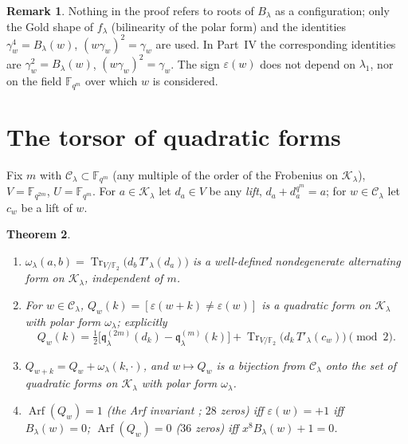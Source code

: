 \documentclass[12pt,a4paper]{amsart}
\newtheorem{theorem}{Theorem}[section]
\theoremstyle{definition}
\newtheorem{remark}[theorem]{Remark}
\newcommand{\F}{\mathbb{F}}
\newcommand{\Tr}{\operatorname{Tr}}
\newcommand{\Arf}{\operatorname{Arf}}
\newcommand{\eps}{\varepsilon}
\newcommand{\Kk}{\mathcal{K}}
\newcommand{\Cc}{\mathcal{C}}
\newcommand{\qq}{\mathfrak{q}}
\begin{document}
\begin{remark}
Nothing in the proof refers to roots of $B_\lambda$ as a configuration; only the Gold shape of $f_\lambda$ (bilinearity of the polar form) and the identities $\gamma_w^4=B_\lambda(w)$, $(w\gamma_w)^2=\gamma_w$ are used. In Part~IV the corresponding identities are $\gamma_w^2=B_\lambda(w)$, $(w\gamma_w)^2=\gamma_w$. The sign $\eps(w)$ does not depend on $\lambda_1$, nor on the field $\F_{q^m}$ over which $w$ is considered.
\end{remark}

\section{The torsor of quadratic forms}\label{sec:torsor}

Fix $m$ with $\Cc_\lambda\subset\F_{q^m}$ (any multiple of the order of the Frobenius on $\Kk_\lambda$), $V=\F_{q^{2m}}$, $U=\F_{q^m}$. For $a\in\Kk_\lambda$ let $d_a\in V$ be any \emph{lift}, $d_a+d_a^{q^m}=a$; for $w\in\Cc_\lambda$ let $c_w$ be a lift of $w$.

\begin{theorem}\label{thm:torsor}
\begin{enumerate}[label=\textup{(\roman*)},leftmargin=2em]
\item $\omega_\lambda(a,b)=\Tr_{V/\F_2}\bigl(d_b\,T'_\lambda(d_a)\bigr)$ is a well-defined nondegenerate alternating form on $\Kk_\lambda$, independent of $m$.
\item For $w\in\Cc_\lambda$, $Q_w(k)=[\eps(w+k)\ne\eps(w)]$ is a quadratic form on $\Kk_\lambda$ with polar form $\omega_\lambda$; explicitly
\begin{equation}\label{eq:Qw}
Q_w(k)=\tfrac12\bigl[\qq^{(2m)}_\lambda(d_k)-\qq^{(m)}_\lambda(k)\bigr]+\Tr_{V/\F_2}\bigl(d_k\,T'_\lambda(c_w)\bigr)\pmod 2 .
\end{equation}
\item $Q_{w+k}=Q_w+\omega_\lambda(k,\cdot)$, and $w\mapsto Q_w$ is a bijection from $\Cc_\lambda$ onto the set of quadratic forms on $\Kk_\lambda$ with polar form $\omega_\lambda$.
\item $\Arf(Q_w)=1$ \textup{(}the Arf invariant \cite{Arf}; $28$ zeros\textup{)} iff $\eps(w)=+1$ iff $B_\lambda(w)=0$; $\Arf(Q_w)=0$ \textup{(}$36$ zeros\textup{)} iff $x^8B_\lambda(w)+1=0$.
\end{enumerate}
\end{theorem}
\end{document}
